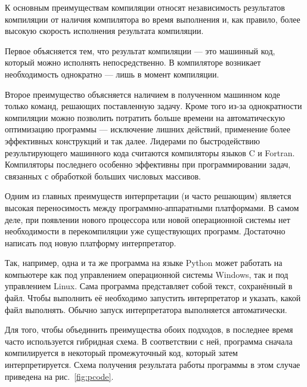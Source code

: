 К основным преимуществам компиляции относят независимость результатов
компиляции от наличия компилятора во время выполнения и, как правило,
более высокую скорость исполнения результата компиляции.

Первое объясняется тем, что результат компиляции — это машинный код,
который можно исполнять непосредственно. В компиляторе возникает
необходимость однократно — лишь в момент компиляции.

Второе преимущество объясняется наличием в полученном машинном коде
только команд, решающих поставленную задачу. Кроме того из-за
однократности компиляции можно позволить потратить больше времени на
автоматическую оптимизацию программы — исключение лишних действий,
применение более эффективных конструкций и так далее. Лидерами по
быстродействию результирующего машинного кода считаются компиляторы
языков C и Fortran. Компиляторы последнего особенно эффективны при
программировании задач, связанных с обработкой больших числовых
массивов.

Одним из главных преимуществ интерпретации (и часто решающим) является
высокая переносимость между программно-аппаратными платформами. В
самом деле, при появлении нового процессора или новой операционной
системы нет необходимости в перекомпиляции уже существующих программ.
Достаточно написать под новую платформу интерпретатор.

Так, например, одна и та же программа на языке Python может работать
на компьютере как под управлением операционной системы Windows, так и
под управлением Linux. Сама программа представляет собой текст,
сохранённый в файл. Чтобы выполнить её необходимо запустить
интерпретатор и указать, какой файл выполнять. Обычно запуск
интерпретатора выполняется автоматически.


Для того, чтобы объединить преимущества обоих подходов, в последнее
время часто используется гибридная схема. В соответствии с ней,
программа сначала компилируется в некоторый промежуточный код, который
затем интерпретируется. Схема получения результата работы программы в
этом случае приведена на рис.~\ref{fig:pcode}.

